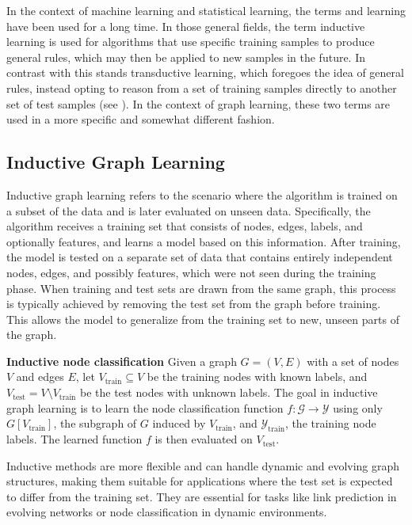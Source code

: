 In the context of machine learning and statistical learning, the terms  and  learning have been used for a long time. In those general fields, the term inductive learning is used for algorithms that use specific training samples to produce general rules, which may then be applied to new samples in the future. In contrast with this stands transductive learning, which foregoes the idea of general rules, instead opting to reason from a set of training samples directly to another set of test samples (see \cite{vapnik_nature_1995}). In the context of graph learning, these two terms are used in a more specific and somewhat different fashion.


\subsection{Inductive Graph Learning}

Inductive graph learning refers to the scenario where the algorithm is trained on a subset of the data and is later evaluated on unseen data. Specifically, the algorithm receives a training set that consists of nodes, edges, labels, and optionally features, and learns a model based on this information. After training, the model is tested on a separate set of data that contains entirely independent nodes, edges, and possibly features, which were not seen during the training phase. When training and test sets are drawn from the same graph, this process is typically achieved by removing the test set from the graph before training. This allows the model to generalize from the training set to new, unseen parts of the graph.

\begin{example}\textbf{Inductive node classification}
	Given a graph \( G = \left( V, E \right) \) with a set of nodes \( V \) and edges \( E \), let \( V_\mathrm{train} \subseteq V \) be the training nodes with known labels, and \( V_\mathrm{test} = V \setminus V_\mathrm{train} \) be the test nodes with unknown labels. The goal in inductive graph learning is to learn the node classification function \( f: \mathcal{G} \rightarrow \mathcal{Y} \) using only \( G \left[ V_\mathrm{train} \right] \), the subgraph of \( G \) induced by \( V_\mathrm{train} \), and \( \mathcal{Y}_\mathrm{train} \), the training node labels. The learned function \( f \) is then evaluated on \( V_\mathrm{test} \).
\end{example}

Inductive methods are more flexible and can handle dynamic and evolving graph structures, making them suitable for applications where the test set is expected to differ from the training set. They are essential for tasks like link prediction in evolving networks or node classification in dynamic environments.

